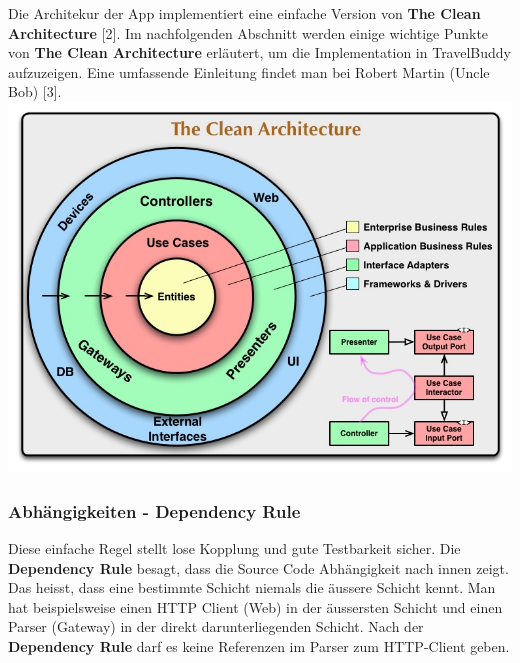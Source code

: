 \documentclass[a4paper,10pt,xetex]{article}
\begin{document}
Die Architekur der App implementiert eine einfache Version von \textbf{The Clean Architecture} [2]. 
Im nachfolgenden Abschnitt werden einige wichtige Punkte von \textbf{The Clean Architecture} 
erläutert, um die Implementation in TravelBuddy aufzuzeigen. Eine umfassende 
Einleitung findet man bei Robert Martin (Uncle Bob) [3].
{\includegraphics{cleanarchitecture}}
\subsubsection{Abhängigkeiten - Dependency Rule}\label{dependencyrule}
Diese einfache Regel stellt lose Kopplung und gute Testbarkeit sicher. 
Die \textbf{Dependency Rule} besagt, dass die Source Code Abhängigkeit nach innen zeigt. 
Das heisst, dass eine bestimmte Schicht niemals die äussere Schicht kennt. 
Man hat beispielsweise einen HTTP Client (Web) in der äussersten Schicht und 
einen Parser (Gateway) in der direkt darunterliegenden Schicht. Nach der 
\textbf{Dependency Rule} darf es keine Referenzen im Parser zum HTTP-Client geben.
\end{document}
